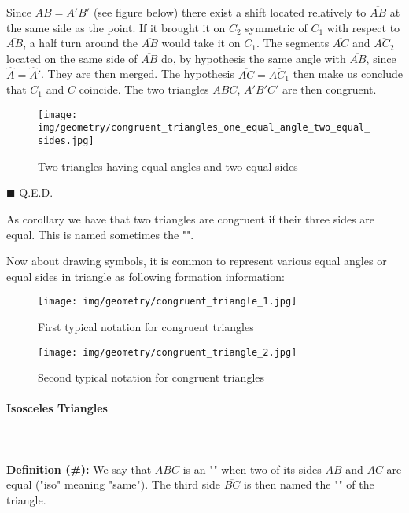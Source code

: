 \begin{enumerate}
\begin{dem}
		Since $AB = A'B'$ (see figure below) there exist a shift located relatively to $\overline{AB}$ at the same side as the point. If it brought it on $C_2$ symmetric of $C_1$ with respect to $\overline{AB}$, a half turn around the $\overline{AB}$ would take it on $C_1$. The segments $\overline{AC}$ and $\overline{AC_2}$ located on the same side of $\overline{AB}$ do, by hypothesis the same angle with $\overline{AB}$, since $\hat{A}=\hat{A}'$. They are then merged. The hypothesis $\overline{AC}=\overline{AC_1}$ then make us conclude that $C_1$ and $C$ coincide. The two triangles $ABC$, $A'B'C'$ are then congruent.
		\begin{figure}[H]
			\centering
			\texttt{[image: img/geometry/congruent\_triangles\_one\_equal\_angle\_two\_equal\_sides.jpg]}
			\caption{Two triangles having equal angles and two equal sides}
		\end{figure}
		\begin{flushright}
			$\blacksquare$  Q.E.D.
		\end{flushright}
		\end{dem}
	\end{enumerate}
	\begin{corollary}
	As corollary we have that two triangles are congruent if their three sides are equal. This is named sometimes the "".
	\end{corollary}
	
	Now about drawing symbols, it is common to represent various equal angles or equal sides in triangle as following formation information:
	\begin{figure}[H]
		\centering
		\texttt{[image: img/geometry/congruent\_triangle\_1.jpg]}
		\caption{First typical notation for congruent triangles}
	\end{figure}
	\begin{figure}[H]
		\centering
		\texttt{[image: img/geometry/congruent\_triangle\_2.jpg]}
		\caption{Second typical notation for congruent triangles}
	\end{figure}
	
	\pagebreak
	\paragraph{Isosceles Triangles}\mbox{}\\\\
	\textbf{Definition (\#\mydef):} We say that $ABC$ is an "" when two of its sides $AB$ and $AC$ are equal ("iso" meaning "same"). The third side $\overline{BC}$ is then named the "" of the triangle.
	
